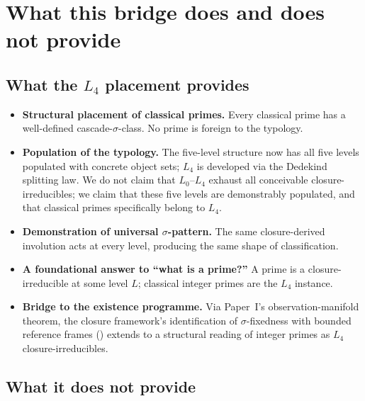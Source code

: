 \documentclass[11pt,a4paper]{article}
\theoremstyle{definition}
\theoremstyle{remark}
\begin{document}
\section{What this bridge does and does not provide}\label{sec:does_does_not}

\subsection{What the $L_4$ placement provides}

\begin{itemize}\itemsep0pt
  \item \textbf{Structural placement of classical primes.} Every classical prime has a well-defined cascade-$\sigma$-class. No prime is foreign to the typology.
  \item \textbf{Population of the typology.} The five-level structure now has all five levels populated with concrete object sets; $L_4$ is developed via the Dedekind splitting law. We do not claim that $L_0$--$L_4$ exhaust all conceivable closure-irreducibles; we claim that these five levels are demonstrably populated, and that classical primes specifically belong to $L_4$.
  \item \textbf{Demonstration of universal $\sigma$-pattern.} The same closure-derived involution acts at every level, producing the same shape of classification.
  \item \textbf{A foundational answer to ``what is a prime?''} A prime is a closure-irreducible at some level $L$; classical integer primes are the $L_4$ instance.
  \item \textbf{Bridge to the existence programme.} Via Paper~I's observation-manifold theorem, the closure framework's identification of $\sigma$-fixedness with bounded reference frames (\cite{SmartExistenceClosure}) extends to a structural reading of integer primes as $L_4$ closure-irreducibles.
\end{itemize}

\subsection{What it does not provide}
\end{document}
